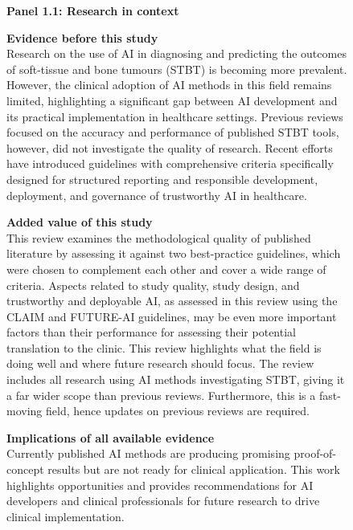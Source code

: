 \begin{figure}[htbp]
\begin{framed}
	\small
	\noindent\textbf{Panel 1.1: Research in context}

	\medskip
	\noindent\textbf{Evidence before this study}\\
	Research on the use of AI in diagnosing and predicting the outcomes of soft-tissue and bone tumours (STBT) is becoming more prevalent.
	However, the clinical adoption of AI methods in this field remains limited, highlighting a significant gap between AI development and its practical implementation in healthcare settings.
	Previous reviews focused on the accuracy and performance of published STBT tools, however, did not investigate the quality of research.
	Recent efforts have introduced guidelines with comprehensive criteria specifically designed for structured reporting and responsible development, deployment, and governance of trustworthy AI in healthcare.

	\medskip
	\noindent\textbf{Added value of this study}\\
	This review examines the methodological quality of published literature by assessing it against two best-practice guidelines, which were chosen to complement each other and cover a wide range of criteria.
	Aspects related to study quality, study design, and trustworthy and deployable AI, as assessed in this review using the CLAIM and FUTURE-AI guidelines, may be even more important factors than their performance for assessing their potential translation to the clinic.
	This review highlights what the field is doing well and where future research should focus.
	The review includes all research using AI methods investigating STBT, giving it a far wider scope than previous reviews.
	Furthermore, this is a fast-moving field, hence updates on previous reviews are required.

	\medskip
	\noindent\textbf{Implications of all available evidence}\\
	Currently published AI methods are producing promising proof-of-concept results but are not ready for clinical application.
	This work highlights opportunities and provides recommendations for AI developers and clinical professionals for future research to drive clinical implementation.
\end{framed}
\end{figure}

\newcommand{\ltcaption}[3]{%
	\par\vspace{\baselineskip}\noindent
	\refstepcounter{table}\label{#1}%
	\addcontentsline{lot}{table}{\protect\numberline{\thetable}#2}%
	{\small\textbf{Table~\thetable:} #3}\par\vspace{0.5\baselineskip}\nopagebreak}

